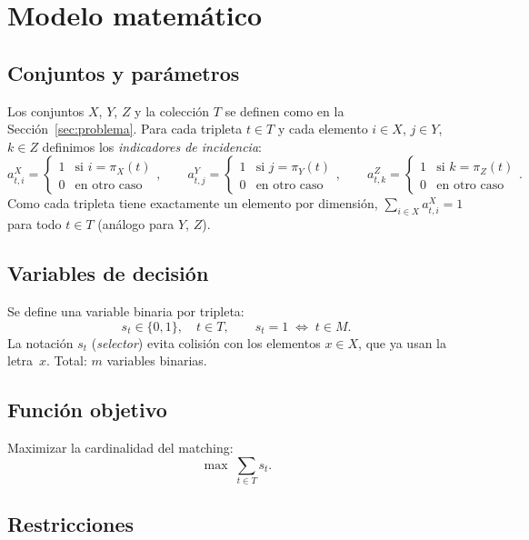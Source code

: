 \section{Modelo matemático}
\label{sec:modelo}

\subsection{Conjuntos y parámetros}
\label{sec:modelo:conjuntos}

Los conjuntos $X$, $Y$, $Z$ y la colección $T$ se definen como en la
Sección~\ref{sec:problema}.  Para cada tripleta $t\in T$ y cada elemento
$i\in X$, $j\in Y$, $k\in Z$ definimos los \emph{indicadores de incidencia}:
\[
a^{X}_{t,i} = \begin{cases} 1 & \text{si } i = \pi_X(t) \\ 0 & \text{en otro caso} \end{cases},
\qquad
a^{Y}_{t,j} = \begin{cases} 1 & \text{si } j = \pi_Y(t) \\ 0 & \text{en otro caso} \end{cases},
\qquad
a^{Z}_{t,k} = \begin{cases} 1 & \text{si } k = \pi_Z(t) \\ 0 & \text{en otro caso} \end{cases}.
\]
Como cada tripleta tiene exactamente un elemento por dimensión,
$\sum_{i\in X} a^{X}_{t,i}=1$ para todo $t\in T$ (análogo para $Y$, $Z$).

\subsection{Variables de decisión}
\label{sec:modelo:variables}

Se define una variable binaria por tripleta:
\[
s_t \in \{0,1\},\quad t\in T,
\qquad
s_t = 1 \;\Longleftrightarrow\; t\in M.
\]
La notación $s_t$ (\emph{selector}) evita colisión con los elementos
$x\in X$, que ya usan la letra~$x$.  Total: $m$ variables binarias.

\subsection{Función objetivo}
\label{sec:modelo:objetivo}

Maximizar la cardinalidad del matching:
\[
\max \;\sum_{t\in T} s_t.
\]

\subsection{Restricciones}
\label{sec:modelo:restricciones}

